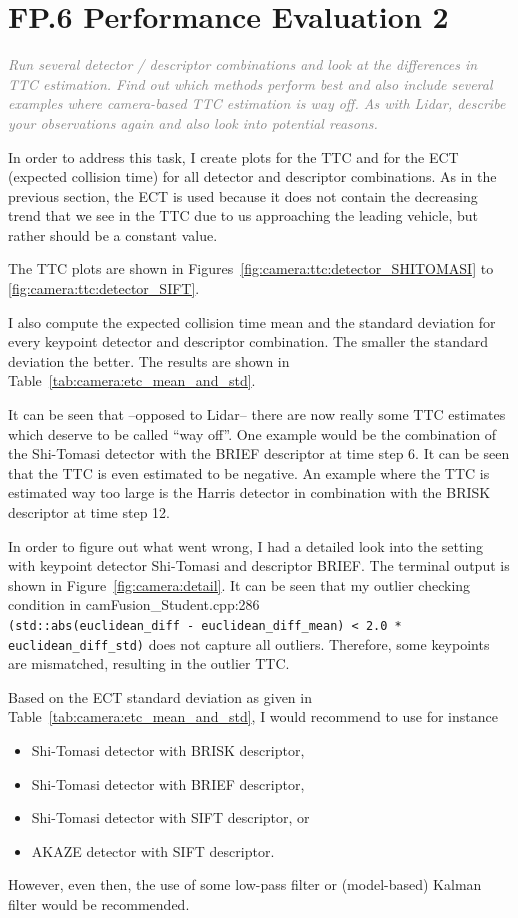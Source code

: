 \documentclass[a4paper]{scrartcl}
\begin{document}
\clearpage

\section*{FP.6 Performance Evaluation 2}
\textcolor{gray}{\textit{Run several detector / descriptor combinations and look at the differences in TTC estimation. Find out which methods perform best and also include several examples where camera-based TTC estimation is way off. As with Lidar, describe your observations again and also look into potential reasons.}}

In order to address this task, I create plots
for the TTC and for the ECT (expected collision time)
for all detector and descriptor combinations.
As in the previous section, the ECT is used because
it does not contain the decreasing trend that we see in the TTC
due to us approaching the leading vehicle,
but rather should be a constant value.

The TTC plots are shown in Figures~\ref{fig:camera:ttc:detector_SHITOMASI}
to \ref{fig:camera:ttc:detector_SIFT}.

I also compute the expected collision time
mean and the standard deviation for
every keypoint detector and descriptor combination.
The smaller the standard deviation the better.
The results are shown in Table~\ref{tab:camera:etc_mean_and_std}.

It can be seen that --opposed to Lidar-- there are now really some TTC estimates
which deserve to be called ``way off''.
One example would be the combination of the Shi-Tomasi detector with
the BRIEF descriptor at time step 6. It can be seen that the TTC is even
estimated to be negative.
An example where the TTC is estimated way too large is the Harris detector
in combination with the BRISK descriptor at time step 12.

In order to figure out what went wrong, I had a detailed look into the
setting with keypoint detector Shi-Tomasi and descriptor BRIEF.
The terminal output is shown in Figure~\ref{fig:camera:detail}.
It can be seen that my
outlier checking condition in camFusion\_Student.cpp:286 \\
\verb+(std::abs(euclidean_diff - euclidean_diff_mean) < 2.0 * euclidean_diff_std)+
does not capture all outliers.
Therefore, some keypoints are mismatched, resulting in the outlier TTC.

Based on the ECT standard deviation as given in Table~\ref{tab:camera:etc_mean_and_std},
I would recommend to use for instance
\begin{itemize}
	\item Shi-Tomasi detector with BRISK descriptor,
	\item Shi-Tomasi detector with BRIEF descriptor,
	\item Shi-Tomasi detector with SIFT descriptor, or
	\item AKAZE detector with SIFT descriptor.
\end{itemize}
However, even then, the use of some low-pass filter or (model-based)
Kalman filter would be recommended.
\end{document}
